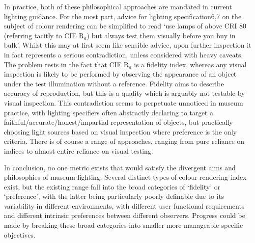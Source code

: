 In practice, both of these philosophical approaches are mandated in current lighting guidance. For the most part, advice for lighting specification6,7 on the subject of colour rendering can be simplified to read `use lamps of above \gls{CRI} 80 (referring tacitly to \gls{CIE} R$_a$) but always test them visually before you buy in bulk'. Whilst this may at first seem like sensible advice, upon further inspection it in fact represents a serious contradiction, unless considered with heavy caveats. The problem rests in the fact that \gls{CIE} R$_a$ is a fidelity index, whereas any visual inspection is likely to be performed by observing the appearance of an object under the test illumination without a reference. Fidelity aims to describe accuracy of reproduction, but this is a quality which is arguably not testable by visual inspection. This contradiction seems to perpetuate unnoticed in museum practice, with lighting specifiers often abstractly declaring to target a faithful/accurate/honest/impartial representation of objects, but practically choosing light sources based on visual inspection where preference is the only criteria. There is of course a range of approaches, ranging from pure reliance on indices to almost entire reliance on visual testing.

In conclusion, no one metric exists that would satisfy the divergent aims and philosophies of museum lighting. Several distinct types of colour rendering index exist, but the existing range fall into the broad categories of `fidelity' or `preference', with the latter being particularly poorly definable due to its variability in different environments, with different user functional requirements and different intrinsic preferences between different observers. Progress could be made by breaking these broad categories into smaller more manageable specific objectives.







